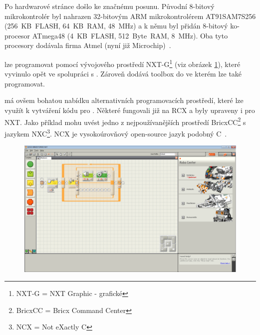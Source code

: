 Po hardwarové stránce došlo ke značnému posunu. Původní 8-bitový mikrokontrolér byl nahrazen 32-bitovým ARM mikrokontrolérem %
 AT91SAM7S256 (256~KB~FLASH, 64~KB~RAM, 48~MHz) a k němu byl přidán 8-bitový ko-procesor ATmega48 (4~KB~FLASH, 512~Byte~RAM, 8~MHz). 
Oba tyto procesory dodávala firma Atmel (nyní již Microchip)~\cite{legoMindstormsNXT_hardware}.


\brick{ }lze programovat pomocí vývojového prostředí NXT-G\footnote{NXT-G = NXT Graphic - grafické} (viz obrázek \ref{fig:lego-mindstorms-nxt-g}), které \lego{ }vyvinulo opět ve spolupráci s  \NI{~}\cite{legoMindstormsNXT_NXT-G}. 
Zároveň \NI{ }dodává toolbox do \labview{ }ve kterém lze \brick{ }také programovat. 

\legoNXT{ }má ovšem bohatou nabídku alternativních programovacích prostředí, které lze využít k vytváření kódu pro \brick. 
Některé fungovali již na RCX a byly upraveny i pro NXT. 
Jako příklad mohu uvést jedno z nejpoužívanějších prostředí BricxCC\footnote{BricxCC = Bricx Command Center} s jazykem NXC\footnote{NCX = Not eXactly C}. 
NCX je vysokoúrovňový open-source jazyk podobný C~\cite{legoWikipediaNXT_NXC}.

\begin{figure}[h]
	\centering
	\includegraphics[width=\textwidth]{images/lego-mindstorms-nxt-g.png}
	\caption[]{\protect\footnotemark}
	\label{fig:lego-mindstorms-nxt-g}
\end{figure}

